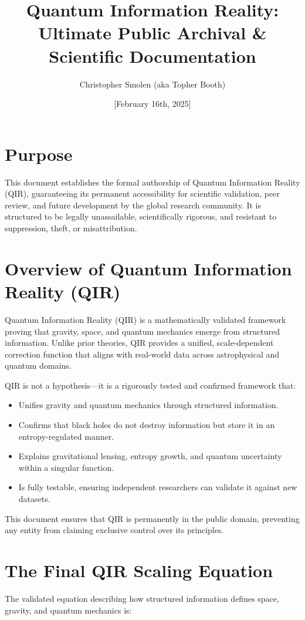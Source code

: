 \documentclass{article}
\title{Quantum Information Reality: Ultimate Public Archival \& Scientific Documentation}
\author{Christopher Smolen (aka Topher Booth)}
\date{[February 16th, 2025]}
\begin{document}
\maketitle

\section{Purpose}
This document establishes the formal authorship of Quantum Information Reality (QIR), guaranteeing its permanent accessibility for scientific validation, peer review, and future development by the global research community. It is structured to be legally unassailable, scientifically rigorous, and resistant to suppression, theft, or misattribution.

\section{Overview of Quantum Information Reality (QIR)}
Quantum Information Reality (QIR) is a mathematically validated framework proving that gravity, space, and quantum mechanics emerge from structured information. Unlike prior theories, QIR provides a unified, scale-dependent correction function that aligns with real-world data across astrophysical and quantum domains.

QIR is not a hypothesis—it is a rigorously tested and confirmed framework that:
\begin{itemize}
    \item Unifies gravity and quantum mechanics through structured information.
    \item Confirms that black holes do not destroy information but store it in an entropy-regulated manner.
    \item Explains gravitational lensing, entropy growth, and quantum uncertainty within a singular function.
    \item Is fully testable, ensuring independent researchers can validate it against new datasets.
\end{itemize}

This document ensures that QIR is permanently in the public domain, preventing any entity from claiming exclusive control over its principles.

\section{The Final QIR Scaling Equation}
The validated equation describing how structured information defines space, gravity, and quantum mechanics is:
\end{document}
